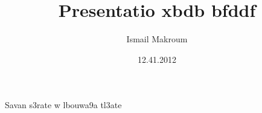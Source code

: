 \documentclass[ngerman]{beamer}
\author{Ismail Makroum}
\title{Presentatio xbdb bfddf}
\institute{Deutsches Zentrum für Luft- und Raumfahrt}
\date{12.41.2012}
\begin{document}
\begin{frame}
\maketitle
\end{frame}

\begin{frame}
Savan s3rate w lbouwa9a tl3ate
\end{frame}
\end{document}
